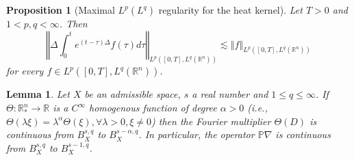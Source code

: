 \documentclass[10pt,a4paper]{amsart}
\newtheorem{lemma}{Lemma}
\newtheorem{proposition}{Proposition}
\begin{document}
\begin{proposition} [Maximal $L^p(L^q)$ regularity for the heat kernel] \label{max}
Let $T>0 $ and $1<p,q<\infty$. Then
\[
\left\Vert \Delta \int_{0}^{t}e^{(t-\tau )\Delta }f(\tau )d\tau \right\Vert_{L^p([0,T],L^q(\mathbb{R}^n))}\lesssim\left\Vert f \right\Vert_{L^p([0,T],L^q(\mathbb{R}^n))}
\]
for every $f\in L^p([0,T],L^q(\mathbb{R}^n))$.
\end{proposition}

\begin{lemma}\label{Fou}
Let $X$ be an admissible space, $s$ a real number and $1\leq q\leq\infty$. If $\Theta:\mathbb{R}^n_\ast\to\mathbb{R}$ is a $C^\infty$  homogenous function of degree $\alpha>0$ (i.e., $\Theta(\lambda\xi)=\lambda^\alpha\Theta(\xi), \forall \lambda>0, \xi\neq 0$) then the Fourier multiplier $\Theta(D)$ is continuous from $B^{s,q}_X$ to $B^{s-\alpha,q}_X$. In particular, the operator $\mathbb{P}\nabla$ is continuous from $B^{s,q}_X$ to $B^{s-1,q}_X$.
\end{lemma}
\end{document}
